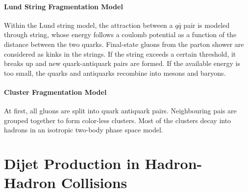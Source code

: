 \paragraph{Lund String Fragmentation Model}

Within the Lund string model, the attraction between a $q\bar q$ pair is
modeled through string, whose energy follows a coulomb potential as a function
of the distance between the two quarks. Final-state gluons from the parton
shower are considered as kinks in the strings. If the string exceeds a certain
threshold, it breaks up and new quark-antiquark pairs are formed. If the
available energy is too small, the quarks and antiquarks recombine into mesons
and baryons.

\paragraph{Cluster Fragmentation Model}

At first, all gluons are split into quark antiquark pairs. Neighbouring pais are
grouped together to form color-less clusters. Most of the clusters decay into
hadrons in an isotropic two-body phase space model.

\section{Dijet Production in Hadron-Hadron Collisions}

